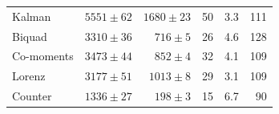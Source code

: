 \documentclass[sigplan,screen,review,anonymous]{acmart}
\begin{document}
\begin{table}
\begin{tabular}{lrrrrr}
    Kalman     & $5551\pm62$ & $1680\pm23$\phantom{0} & \phantom{0}50 & \phantom{0}3.3 & 111 \\
    Biquad     & $3310\pm36$ & \phantom{0}$716\pm5$\phantom{0}\phantom{0}  & \phantom{0}26 & \phantom{0}4.6 & 128 \\
    Co-moments & $3473\pm44$ & \phantom{0}$852\pm4$\phantom{0}\phantom{0}  & \phantom{0}32 & \phantom{0}4.1 & 109 \\
    Lorenz     & $3177\pm51$ & $1013\pm8$\phantom{0} & \phantom{0}29 & \phantom{0}3.1 & 109 \\
    \midrule
    Counter    & $1336\pm27$ & \phantom{0}$198\pm3$\phantom{0}\phantom{0}  & \phantom{0}15 & \phantom{0}6.7 & \phantom{0}90 \\
    \bottomrule
  \end{tabular}
\end{table}
\end{document}
